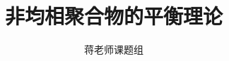 \documentclass[12pt,a4paper]{article}
\title{非均相聚合物的平衡理论}
\author{蒋老师课题组}
\date{\chntoday}
\begin{document}
\maketitle




\cite{tam19912d}

\end{document}
